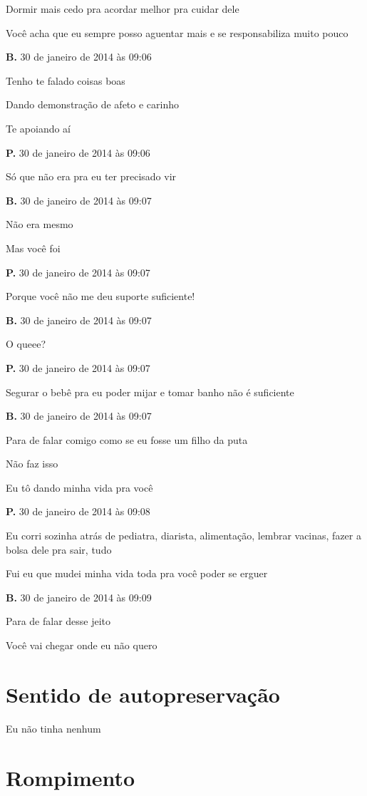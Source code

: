 {Dormir mais cedo pra acordar melhor pra cuidar dele

Você acha que eu sempre posso aguentar mais e se responsabiliza muito
pouco

\textbf{B.} 30 de janeiro de 2014 às 09:06

Tenho te falado coisas boas

Dando demonstração de afeto e carinho

Te apoiando aí

\textbf{P.} 30 de janeiro de 2014 às 09:06

Só que não era pra eu ter precisado vir

\textbf{B.} 30 de janeiro de 2014 às 09:07

Não era mesmo

Mas você foi

\textbf{P.} 30 de janeiro de 2014 às 09:07

Porque você não me deu suporte suficiente!

\textbf{B.} 30 de janeiro de 2014 às 09:07

O queee?

\textbf{P.} 30 de janeiro de 2014 às 09:07

Segurar o bebê pra eu poder mijar e tomar banho não é suficiente

\textbf{B.} 30 de janeiro de 2014 às 09:07

Para de falar comigo como se eu fosse um filho da puta

Não faz isso

Eu tô dando minha vida pra você

\textbf{P.} 30 de janeiro de 2014 às 09:08

Eu corri sozinha atrás de pediatra, diarista, alimentação, lembrar
vacinas, fazer a bolsa dele pra sair, tudo

Fui eu que mudei minha vida toda pra você poder se erguer

\textbf{B.} 30 de janeiro de 2014 às 09:09

Para de falar desse jeito

Você vai chegar onde eu não quero}

\chapter{Sentido de
autopreservação}\label{sentido-de-autopreservauxe7uxe3o}

Eu não tinha nenhum

\chapter{Rompimento}


